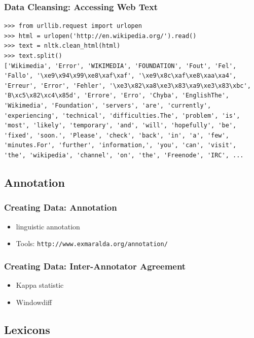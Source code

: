 \documentclass{beamer}             %
\begin{document}
\begin{frame}[fragile]
\frametitle{Data Cleansing: Accessing Web Text}

\scriptsize
\begin{verbatim}
>>> from urllib.request import urlopen
>>> html = urlopen('http://en.wikipedia.org/').read()
>>> text = nltk.clean_html(html)
>>> text.split()
['Wikimedia', 'Error', 'WIKIMEDIA', 'FOUNDATION', 'Fout', 'Fel',
'Fallo', '\xe9\x94\x99\xe8\xaf\xaf', '\xe9\x8c\xaf\xe8\xaa\xa4',
'Erreur', 'Error', 'Fehler', '\xe3\x82\xa8\xe3\x83\xa9\xe3\x83\xbc',
'B\xc5\x82\xc4\x85d', 'Errore', 'Erro', 'Chyba', 'EnglishThe',
'Wikimedia', 'Foundation', 'servers', 'are', 'currently',
'experiencing', 'technical', 'difficulties.The', 'problem', 'is',
'most', 'likely', 'temporary', 'and', 'will', 'hopefully', 'be',
'fixed', 'soon.', 'Please', 'check', 'back', 'in', 'a', 'few',
'minutes.For', 'further', 'information,', 'you', 'can', 'visit',
'the', 'wikipedia', 'channel', 'on', 'the', 'Freenode', 'IRC', ...
\end{verbatim}
\end{frame}

\subsection{Annotation}

\begin{frame}[fragile]
\frametitle{Creating Data: Annotation}

\begin{itemize}
\item linguistic annotation
\item Tools: \verb|http://www.exmaralda.org/annotation/|
\end{itemize}
\end{frame}

\begin{frame}[fragile]
\frametitle{Creating Data: Inter-Annotator Agreement}
  \begin{itemize}
  \item Kappa statistic
  \item Windowdiff
  \end{itemize}
\end{frame}

\subsection{Lexicons}
\end{document}
